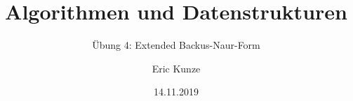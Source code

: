 \documentclass{beamer}
\newcommand{\wdh}[1]{\hat{\{} \ #1 \ \hat{\}}}
\newcommand{\opt}[2]{\hat{(} \ #1 \ \hat{|} \ #2 \ \hat{)}}
\newcommand{\byp}[1]{\hat{[} \ #1 \ \hat{]}}
\newcommand{\rdb}[1]{\hat{(} \ #1 \ \hat{)}}
\begin{document}
	
	\title{Algorithmen und Datenstrukturen}
	\subtitle{Übung 4: Extended Backus-Naur-Form}
	\author{Eric Kunze}
	\date{14.11.2019}

	\maketitle



\end{document}
